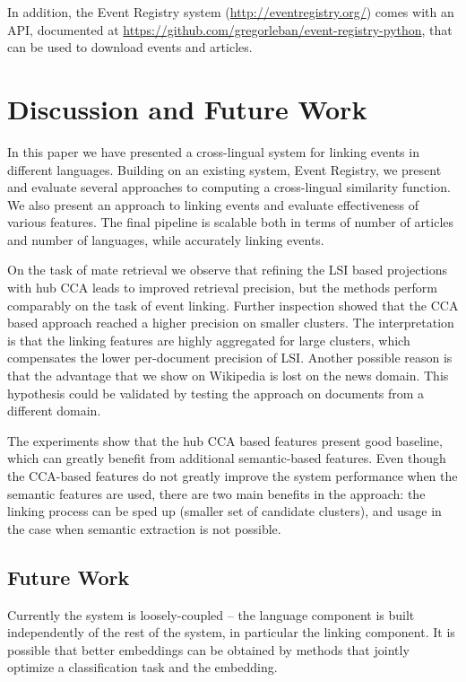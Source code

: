 \documentclass[twoside,11pt]{article}
\begin{document}
In addition, the Event Registry system (\url{http://eventregistry.org/}) comes with an API, documented at \url{https://github.com/gregorleban/event-registry-python}, that can be used to download events and articles.

\section{Discussion and Future Work}

In this paper we have presented a cross-lingual system for linking events in different languages. Building on an existing system, Event Registry, we present and evaluate several approaches to computing a  cross-lingual similarity function. We also present an approach to linking events and evaluate effectiveness of various features.  The  final pipeline is scalable both in terms of number of articles and number of languages, while accurately linking events.

On the task of mate retrieval we observe that refining the LSI based projections with hub CCA leads to improved retrieval precision, but the methods perform comparably on the task of event linking. Further inspection showed that the CCA based approach reached a higher precision on smaller clusters. The interpretation is that the linking features are highly aggregated for large clusters, which compensates the lower per-document precision of LSI. Another possible reason is that the advantage that we show on Wikipedia is lost on the news domain. This hypothesis could be validated by testing the approach on documents from a different domain.

The experiments show that the hub CCA based features present good baseline, which can greatly benefit from additional semantic-based features. Even though the CCA-based features do not greatly improve the system performance when the semantic features are used, there are two main benefits in the approach: the linking process can be sped up (smaller set of candidate clusters), and usage in the case when semantic extraction is not possible.

\subsection{Future Work}

Currently the system is loosely-coupled -- the language component is built independently of the rest of the system, in particular the linking component. It is possible that better embeddings can be obtained by methods that jointly optimize a classification task and the embedding.
		
\end{document}
